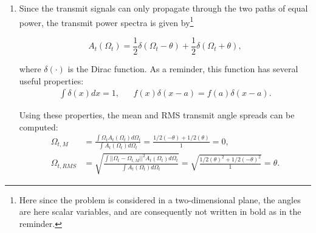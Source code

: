 \documentclass [a4paper, 11pt] {article}
\begin{document}
    \begin{solution}
        
            
      \begin{enumerate}

\item Since the transmit signals can only propagate through the two paths of equal power, the transmit power spectra is given by\footnote{Here since the problem is considered in a two-dimensional plane, the angles are here scalar variables, and are consequently not written in bold as in the reminder.}
    
    \begin{equation}
        A_t(\Omega_t) = \frac{1}{2} \delta(\Omega_t - \theta) + \frac{1}{2} \delta(\Omega_t + \theta),
    \end{equation}
    
    where $\delta (\cdot)$ is the Dirac function. As a reminder, this function has several useful properties: 
    \begin{align}
        \int \delta (x) dx = 1, &&  f(x) \delta (x-a) = f(a)\delta (x-a).
    \end{align}
    
    Using these properties, the mean and RMS transmit angle spreads can be computed: 
    \begin{align}
      \Omega_{t,M} &= \frac{\int \Omega_t A_t(\Omega_t) d\Omega_t}{\int A_t(\Omega_t) d\Omega_t}  = \frac{1/2(-\theta) + 1/2(\theta)}{1}=0, \\
      \Omega_{t,RMS} &= \sqrt{\frac{\int \big| \big| \Omega_t - \Omega_{t,M} \big| \big|^2 A_t(\Omega_t) d\Omega_t}{\int A_t(\Omega_t) d\Omega_t}} = \sqrt{\frac{1/2(\theta)^2 + 1/2 (-\theta)^2}{1}} = \theta.
    \end{align}
    

\end{enumerate}
\end{solution}
\end{document}
